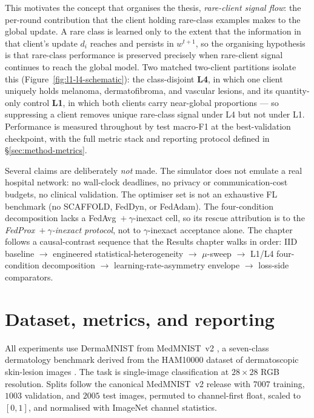 \documentclass[11pt,a4paper]{report}
\begin{document}
This motivates the concept that organises the thesis, \emph{rare-client signal
flow}: the per-round contribution that the client holding rare-class examples
makes to the global update. A rare class is learned only to the extent that the
information in that client's update $d_i$ reaches and persists in $w^{t+1}$, so the
organising hypothesis is that rare-class performance is preserved precisely when
rare-client signal continues to reach the global model. Two matched two-client
partitions isolate this (Figure~\ref{fig:l1-l4-schematic}): the class-disjoint
\textbf{L4}, in which one client uniquely holds melanoma, dermatofibroma, and
vascular lesions, and its quantity-only control \textbf{L1}, in which both clients
carry near-global proportions --- so suppressing a client removes unique
rare-class signal under L4 but not under L1. Performance is measured throughout by
test macro-F1 at the best-validation checkpoint, with the full metric stack and
reporting protocol defined in \S\ref{sec:method-metrics}.

Several claims are deliberately \emph{not} made. The simulator does not emulate a
real hospital network: no wall-clock deadlines, no privacy or communication-cost
budgets, no clinical validation. The optimiser set is not an exhaustive FL
benchmark (no SCAFFOLD, FedDyn, or FedAdam). The four-condition decomposition
lacks a FedAvg~$+~\gamma$-inexact cell, so its rescue attribution is to the
\emph{FedProx~$+~\gamma$-inexact protocol}, not to $\gamma$-inexact acceptance
alone. The chapter follows a causal-contrast sequence that the
Results chapter walks in order: IID baseline $\to$ engineered
statistical-heterogeneity $\to$ $\mu$-sweep $\to$ L1/L4 four-condition
decomposition $\to$ learning-rate-asymmetry envelope $\to$ loss-side comparators.

\section{Dataset, metrics, and reporting}
\label{sec:method-dataset}
\label{sec:method-metrics}

All experiments use DermaMNIST from MedMNIST~v2 \citep{yang2023medmnistv2}, a
seven-class dermatology benchmark derived from the HAM10000 dataset of
dermatoscopic skin-lesion images \citep{tschandl2018ham10000}. The task is
single-image classification at $28 \times 28$ RGB resolution. Splits follow the
canonical MedMNIST~v2 release with $7007$ training, $1003$ validation, and $2005$
test images, permuted to channel-first float, scaled to $[0, 1]$, and normalised
with ImageNet channel statistics.
\end{document}
